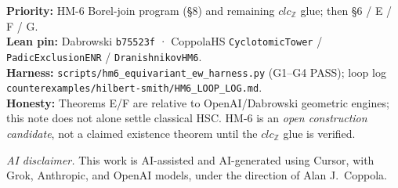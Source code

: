 \documentclass[11pt]{article}
\begin{document}
\vspace{1em}
\noindent\textbf{Priority:} HM-6 Borel-join program (\S8) and remaining $clc_{\mathbb{Z}}$ glue;
then \S6 / E / F / G.\\
\noindent\textbf{Lean pin:} Dabrowski \texttt{b75523f} · CoppolaHS
\texttt{CyclotomicTower} / \texttt{PadicExclusionENR} / \texttt{DranishnikovHM6}.\\
\noindent\textbf{Harness:} \texttt{scripts/hm6\_equivariant\_ew\_harness.py}
(G1--G4 PASS); loop log
\texttt{counterexamples/hilbert-smith/HM6\_LOOP\_LOG.md}.\\
\noindent\textbf{Honesty:} Theorems E/F are relative to OpenAI/Dabrowski geometric
engines; this note does not alone settle classical HSC.
HM-6 is an \emph{open construction candidate}, not a claimed existence theorem
until the $clc_{\mathbb{Z}}$ glue is verified.

\vspace{0.6em}
\noindent\footnotesize\textit{AI disclaimer.} This work is AI-assisted and AI-generated using Cursor, with Grok, Anthropic, and OpenAI models, under the direction of Alan J.\ Coppola.
\end{document}
